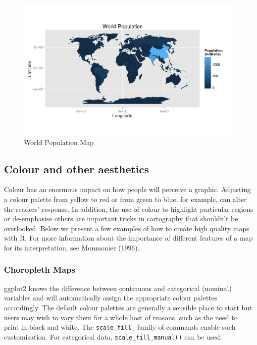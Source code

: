 \documentclass[]{article}
\begin{document}
\begin{figure}[htbp]
\centering
\includegraphics{figure/World_Population_Map.png}
\caption{World Population Map}
\end{figure}

\subsection{Colour and other
aesthetics}\label{colour-and-other-aesthetics}

Colour has an enormous impact on how people will perceive a graphic.
Adjusting a colour palette from yellow to red or from green to blue, for
example, can alter the readers' response. In addition, the use of colour
to highlight particular regions or de-emphasise others are important
tricks in cartography that shouldn't be overlooked. Below we present a
few examples of how to create high quality maps with R. For more
information about the importance of different features of a map for its
interpretation, see Monmonier (1996).

\subsubsection{Choropleth Maps}\label{choropleth-maps}

ggplot2 knows the difference between continuous and categorical
(nominal) variables and will automatically assign the appropriate colour
palettes accordingly. The default colour palettes are generally a
sensible place to start but users may wish to vary them for a whole host
of reasons, such as the need to print in black and white. The
\texttt{scale\_fill\_} family of commands enable such customisation. For
categorical data, \texttt{scale\_fill\_manual()} can be used:
\end{document}
